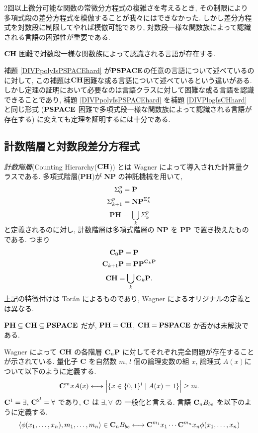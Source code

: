 2回以上微分可能な関数の常微分方程式の複雑さを考えるとき,
その制限により多項式段の差分方程式を模倣することが我々にはできなかった.
しかし差分方程式を対数段に制限してやれば模倣可能であり,
対数段一様な関数族によって認識される言語の困難性が重要である.

\begin{lemma}
 \label{DIVPlogIsCHhard}
 $\mathbf{CH}$ 困難で対数段一様な関数族によって認識される言語が存在する.
\end{lemma}

補題 \ref{DIVPpolyIsPSPACEhard} が$\mathbf{PSPACE}$の任意の言語について述べているのに対して,
この補題は$\mathbf{CH}$困難な或る言語について述べているという違いがある.
しかし定理の証明において必要なのは言語クラスに対して困難な或る言語を認識できることであり,
補題 \ref{DIVPpolyIsPSPACEhard} を補題 \ref{DIVPlogIsCHhard} と同じ形式
($\mathbf{PSPACE}$ 困難で多項式段一様な関数族によって認識される言語が存在する)
に変えても定理を証明するには十分である.


\subsection{計数階層と対数段差分方程式}
\label{subsection: counting hierarchy}

\emph{計数階層}(Counting Hierarchy($\mathbf{CH}$)) とは
Wagner によって導入された計算量クラスである\cite{wagner1986complexity}.
多項式階層({\bf PH})が {\bf NP} の神託機械を用いて,
\begin{align*}
 \Sigma^p_0 
 &= \mathbf{P} \\
 \Sigma^p_{k+1}
 &= \mathbf{NP}^{\Sigma^p_k}
\end{align*}
\[
 \mathbf{PH} = \bigcup_k \Sigma^p_k
\]
と定義されるのに対し,
計数階層は多項式階層の {\bf NP} を {\bf PP} で置き換えたものである. つまり
\begin{align*}
 \mathbf{C}_0 \mathbf{P}  
 &= \mathbf{P} \\
 \mathbf{C}_{k+1} \mathbf{P}
 &= \mathbf{PP}^{\mathbf{C}_k \mathbf{P}}
\end{align*}
\[
 \mathbf{CH} = \bigcup_k \mathbf{C}_k \mathbf{P}.
\]
上記の特徴付けは Tor{\'a}n によるものであり,
Wagner によるオリジナルの定義とは異なる\cite{toran1991complexity}.

$\mathbf{PH} \subseteq \mathbf{CH} \subseteq \mathbf{PSPACE}$ だが,
$\mathbf{PH} = \mathbf{CH}$, $\mathbf{CH} = \mathbf{PSPACE}$
か否かは未解決である.

Wagner によって $\mathbf{CH}$ の各階層 $\mathbf{C}_n \mathbf{P}$ に対してそれぞれ完全問題が存在することが示されている\cite{wagner1986complexity}.
量化子 $\mathbf{C}$ を自然数 $m$, $l$ 個の論理変数の組 $x$,
論理式 $A(x)$について以下のように定義する.
\begin{equation}
 \mathbf{C}^m x A(x) 
  \longleftrightarrow 
  \Bigl|\{x \in \{0, 1\}^l \mid A(x) = 1\}\Bigr| \ge m.
\end{equation}
$\mathbf{C}^1 = \exists$, $\mathbf{C}^{2^l} = \forall$ であり, $\mathbf{C}$ は $\exists, \forall$ の
一般化と言える.
言語 $\mathbf{C}_n B_{be}$ を以下のように定義する.
\begin{equation}
 \langle \phi(x_1, \dots, x_n), m_1, \dots, m_n \rangle \in \mathbf{C}_n B_{be}
 \longleftrightarrow
 \mathbf{C}^{m_1}{x_1} \cdots \mathbf{C}^{m_n}{x_n} \phi(x_1, \dots, x_n) 
\end{equation}


